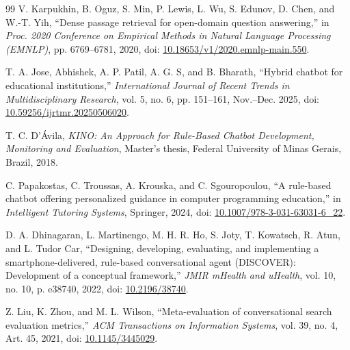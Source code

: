 \documentclass[12pt,a4paper]{article}
\begin{document}
\begin{thebibliography}{99}
V. Karpukhin, B. Oguz, S. Min, P. Lewis, L. Wu, S. Edunov, D. Chen, and W.-T. Yih, ``Dense passage retrieval for open-domain question answering,'' in \textit{Proc. 2020 Conference on Empirical Methods in Natural Language Processing (EMNLP)}, pp. 6769--6781, 2020, doi: \href{https://doi.org/10.18653/v1/2020.emnlp-main.550}{10.18653/v1/2020.emnlp-main.550}.

T. A. Jose, Abhishek, A. P. Patil, A. G. S, and B. Bharath, ``Hybrid chatbot for educational institutions,'' \textit{International Journal of Recent Trends in Multidisciplinary Research}, vol. 5, no. 6, pp. 151--161, Nov.--Dec. 2025, doi: \href{https://doi.org/10.59256/ijrtmr.20250506020}{10.59256/ijrtmr.20250506020}.

T. C. D'Ávila, \textit{KINO: An Approach for Rule-Based Chatbot Development, Monitoring and Evaluation}, Master's thesis, Federal University of Minas Gerais, Brazil, 2018.

C. Papakostas, C. Troussas, A. Krouska, and C. Sgouropoulou, ``A rule-based chatbot offering personalized guidance in computer programming education,'' in \textit{Intelligent Tutoring Systems}, Springer, 2024, doi: \href{https://doi.org/10.1007/978-3-031-63031-6_22}{10.1007/978-3-031-63031-6\_22}.

D. A. Dhinagaran, L. Martinengo, M. H. R. Ho, S. Joty, T. Kowatsch, R. Atun, and L. Tudor Car, ``Designing, developing, evaluating, and implementing a smartphone-delivered, rule-based conversational agent (DISCOVER): Development of a conceptual framework,'' \textit{JMIR mHealth and uHealth}, vol. 10, no. 10, p. e38740, 2022, doi: \href{https://doi.org/10.2196/38740}{10.2196/38740}.

Z. Liu, K. Zhou, and M. L. Wilson, ``Meta-evaluation of conversational search evaluation metrics,'' \textit{ACM Transactions on Information Systems}, vol. 39, no. 4, Art. 45, 2021, doi: \href{https://doi.org/10.1145/3445029}{10.1145/3445029}.

\end{thebibliography}
\end{document}
